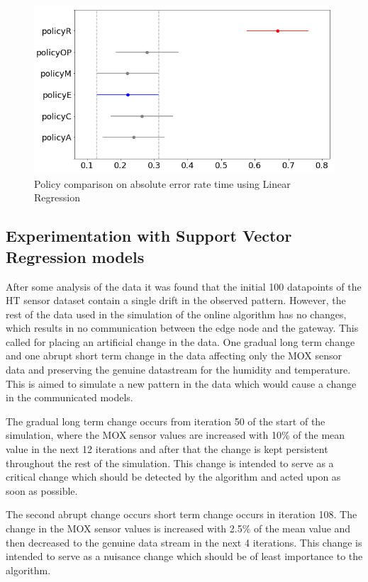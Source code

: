 \documentclass{mpaper}
\begin{document}
\begin{figure}[t!]
    \centering
    \includegraphics[scale=0.35]{imgs/lin_reg_pi3_error_plot_diff_means.png}
    \caption{Policy comparison on absolute error rate time using Linear Regression}
    \label{fig:lin_reg_pi3_waiting_plot_diff_means}
\end{figure}

\subsection{Experimentation with Support Vector Regression models}

After some analysis of the data it was found that the initial 100 datapoints of the HT sensor dataset contain a single drift in the observed pattern. However, the rest of the data used in the simulation of the online algorithm has no changes, which results in no communication between the edge node and the gateway. This called for placing an artificial change in the data. One gradual long term change and one abrupt short term change in the data affecting only the MOX sensor data and preserving the genuine datastream for the humidity and temperature. This is aimed to simulate a new pattern in the data which would cause a change in the communicated models.

The gradual long term change occurs from iteration 50 of the start of the simulation, where the MOX sensor values are increased with 10\% of the mean value in the next 12 iterations and after that the change is kept persistent throughout the rest of the simulation. This change is intended to serve as a critical change \cite{lautay2018} which should be detected by the algorithm and acted upon as soon as possible.

The second abrupt change occurs short term change occurs in iteration 108. The change in the MOX sensor values is increased with 2.5\% of the mean value and then decreased to the genuine data stream in the next 4 iterations. This change is intended to serve as a nuisance change \cite{lautay2018} which should be of least importance to the algorithm.
\end{document}
